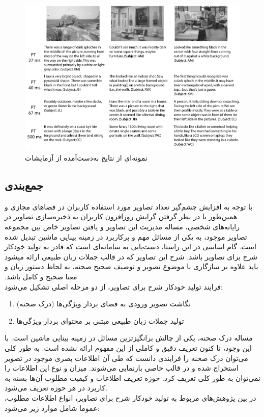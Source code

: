 \begin{figure}[H]
\center
\includegraphics[scale=0.4]{./Imgs/fei2007we_res4.png}
\caption{نمونه‌ای از نتایج به‌دست‌آمده از آزمایشات\cite{fei2007we}}
\label{fig:f2007res4}
\end{figure}

\subsection{جمع‌بندی}
‫با توجه به افزایش چشم‌گیر تعداد تصاویر مورد استفاده کاربران در فضاهای مجازی و همین‌طور با در نظر گرفتن گرایش روزافزون کاربران به ذخیره‌سازی تصاویر در رایانه‌های شخصی، مساله مدیریت این تصاویر و یافتن تصاویر خاص بین مجموعه تصاویر موجود، به یکی از مسائل مهم و پرکاربرد در زمینه بینایی ماشین تبدیل شده‌ است. گام اساسی در این راستا، دست‌یابی به سامانه‌ای است که قادر به تولید خودکار شرح برای تصاویر باشد. شرح این تصاویر که در قالب جملات زبان طبیعی ارائه می­شود باید علاوه بر سازگاری با موضوع تصویر و توصیف صحیح صحنه، به لحاظ دستور زبان و معنا صحیح و کامل باشد. 
\\
فرایند تولید خودکار شرح برای تصاویر، از دو مرحله اصلی تشکیل می‌شود:
\begin{enumerate}
\item نگاشت تصویر ورودی به فضای بردار ویژگی‌ها (درک صحنه)
\item تولید جملات زبان طبیعی مبتنی بر محتوای بردار ویژگی‌ها 
\end{enumerate}

مساله درک صحنه، یکی از چالش‌ بر‌انگیزتزین مسائل در زمینه بینایی ماشین است. با این وجود، تا کنون تعریف دقیق و کاملی از این مفهوم ارائه نشده است. به طور کلی می‌توان درک صحنه را فرایندی دانست که طی آن اطلاعات بصری موجود در تصویر استخراج شده و در قالب خاصی بازنمایی می‌شوند. میزان و نوع این اطلاعات را نمی‌توان به طور کلی تعریف کرد. حوزه تعریف اطلاعات و کیفیت مطلوب آن‌ها بسته به کاربرد در هر حوزه تعریف می‌شود.
\\
در بین پژوهش‌های مربوط به تولید خودکار شرح برای تصاویر، انواع اطلاعات مطلوب، عموما شامل موارد زیر می‌شود:


